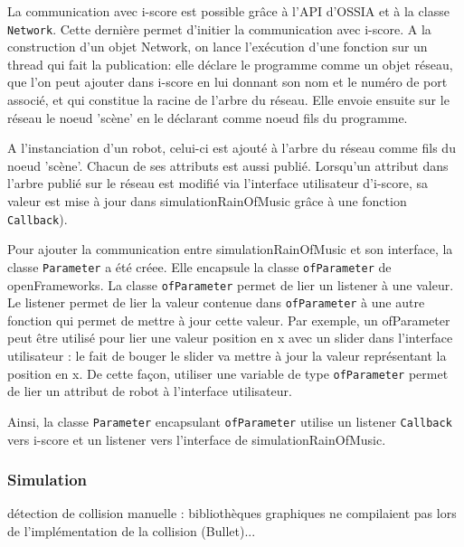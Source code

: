 La communication avec i-score est possible grâce à l'API d'OSSIA et à la classe \verb|Network|. Cette dernière permet d'initier la communication avec i-score. A la construction d'un objet Network, on lance l'exécution d'une fonction sur un thread qui fait la publication: elle déclare le programme comme un objet réseau, que l'on peut ajouter dans i-score en lui donnant son nom et le numéro de port associé, et qui constitue la racine de l'arbre du réseau. Elle envoie ensuite sur le réseau le noeud 'scène' en le déclarant comme noeud fils du programme.

A l'instanciation d'un robot, celui-ci est ajouté à l'arbre du réseau comme fils du noeud 'scène'. Chacun de ses attributs est aussi publié. Lorsqu'un attribut dans l'arbre publié sur le réseau est modifié via l'interface utilisateur d'i-score, sa valeur est mise à jour dans simulationRainOfMusic grâce à une fonction \verb|Callback|).

Pour ajouter la communication entre simulationRainOfMusic et son interface, la classe \verb|Parameter| a été créee. Elle encapsule la classe \verb|ofParameter| de openFrameworks. La classe \verb|ofParameter| permet de lier un listener à une valeur. Le listener permet de lier la valeur contenue dans \verb|ofParameter| à une autre fonction qui permet de mettre à jour cette valeur. Par exemple, un ofParameter peut être utilisé pour lier une valeur position en x avec un slider dans l'interface utilisateur : le fait de bouger le slider va mettre à jour la valeur représentant la position en x. De cette façon, utiliser une variable de type \verb|ofParameter| permet de lier un attribut de robot à l'interface utilisateur. 

Ainsi, la classe \verb|Parameter| encapsulant \verb|ofParameter| utilise un listener \verb|Callback| vers i-score et un listener vers l'interface de simulationRainOfMusic.

\subsubsection{Simulation}

détection de collision manuelle : bibliothèques graphiques ne compilaient pas lors de l'implémentation de la collision (Bullet)...

